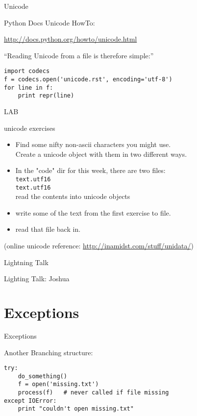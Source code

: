 \documentclass{beamer}
\begin{document}
\begin{frame}[fragile]{Unicode}

{\Large Python Docs Unicode HowTo:}

\url{http://docs.python.org/howto/unicode.html}

\vfill
``Reading Unicode from a file is therefore simple:''

\begin{verbatim}
import codecs
f = codecs.open('unicode.rst', encoding='utf-8')
for line in f:
    print repr(line)
\end{verbatim}

\end{frame}

\begin{frame}[fragile]{LAB}

{\Large unicode exercises}
\begin{itemize}
  \item Find some nifty non-ascii characters you might use.\\
        Create a unicode object with them in two different ways.
  \item In the "code" dir for this week, there are two files:\\
        \verb|text.utf16| \\
        \verb|text.utf16| \\
        read the contents into unicode objects
  \item write some of the text from the first exercise to file.
  \item read that file back in.
\end{itemize}

\vfill
(online unicode reference: \url{http://inamidst.com/stuff/unidata/})
\end{frame}

\begin{frame}{Lightning Talk}

{\center

\LARGE Lighting Talk:
\vfill
Joshua
\vfill

}
\end{frame}

\section{Exceptions}

\begin{frame}[fragile]{Exceptions}

{\Large Another Branching structure:}
\vfill
\begin{verbatim}
try:
    do_something()
    f = open('missing.txt')
    process(f)   # never called if file missing
except IOError:
    print "couldn't open missing.txt"
\end{verbatim}
\vfill
\end{frame}
\end{document}

